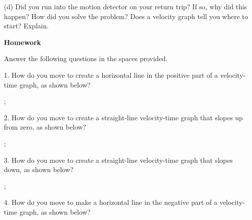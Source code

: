 (d) Did you run into the motion detector on your return trip? If so, why did
this happen? How did you solve the problem? Does a velocity graph tell you where
to start? Explain.
\answerspace{25mm}

\pagebreak[2]
\textbf{Homework} 

Answer the following questions in the spaces provided.

1. How do you move to create a horizontal line in the positive part of a velocity-time
graph, as shown below?

\begin{lab_axis}[lab_noticks_2quads,
	scale only axis=true,
	height = {1.4in}, width = {2.0in},
	xlabel={Time},
	ylabel={Velocity},
	plus_minus_zero_labels,
	]
;
\end{lab_axis}
\answerspace{0.2in}

2. How do you move to create a straight-line velocity-time graph that slopes
up from zero, as shown below?

\begin{lab_axis}[lab_noticks_2quads,
	scale only axis=true,
	height = {1.4in}, width = {2.0in},
	xlabel={Time},
	ylabel={Velocity},
	plus_minus_zero_labels,
	]
;
\end{lab_axis}
\answerspace{0.2in}

3. How do you move to create a straight-line velocity-time graph that slopes
down, as shown below?

\begin{lab_axis}[lab_noticks_2quads,
	scale only axis=true,
	height = {1.4in}, width = {2.0in},
	xlabel={Time},
	ylabel={Velocity},
	plus_minus_zero_labels,
	]
;
\end{lab_axis}
\answerspace{0.2in}

4. How do you move to make a horizontal line in the negative part of a velocity-time
graph, as shown below?

